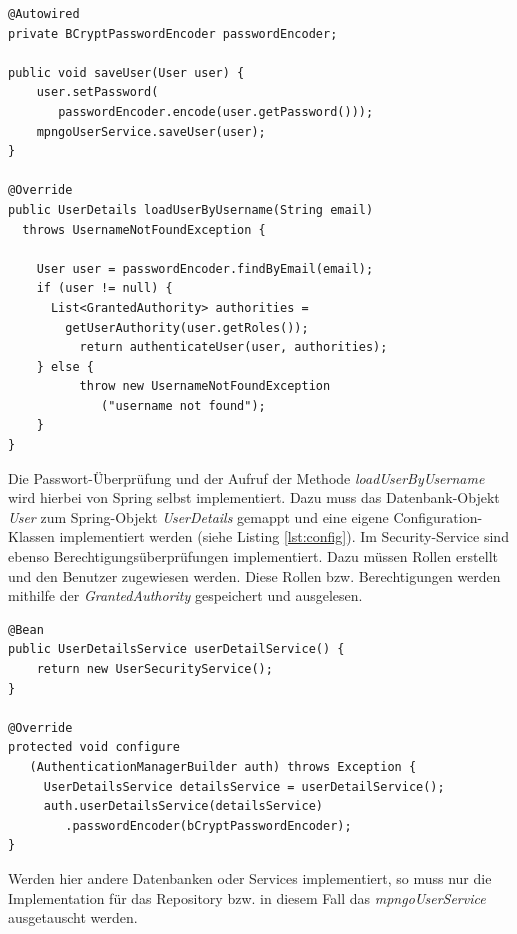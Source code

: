 \begin{samepage}%
	\begin{lstlisting}[float=tbhp]
@Autowired
private BCryptPasswordEncoder passwordEncoder;

public void saveUser(User user) {
    user.setPassword(
       passwordEncoder.encode(user.getPassword()));
    mpngoUserService.saveUser(user);
}

@Override
public UserDetails loadUserByUsername(String email) 
  throws UsernameNotFoundException {

    User user = passwordEncoder.findByEmail(email);
    if (user != null) {
      List<GrantedAuthority> authorities =     
        getUserAuthority(user.getRoles());
          return authenticateUser(user, authorities);
    } else {
          throw new UsernameNotFoundException
             ("username not found");
    }
}
	\end{lstlisting}
\end{samepage}
Die Passwort-Überprüfung und der Aufruf der Methode \textit{loadUserByUsername} wird hierbei von Spring selbst implementiert.  Dazu muss das Datenbank-Objekt \textit{User} zum Spring-Objekt \textit{UserDetails} gemappt und eine eigene Configuration-Klassen implementiert werden (siehe Listing \ref{lst:config}). Im Security-Service sind ebenso Berechtigungsüberprüfungen implementiert. Dazu müssen Rollen erstellt und den Benutzer zugewiesen werden. Diese Rollen bzw. Berechtigungen werden mithilfe der \textit{GrantedAuthority} gespeichert und ausgelesen.

\lstset{
  caption={Konfiguration für das Spring Security UserService. Das Service \textit{UserSecurityService} wird nun als das zentrale Service für die Useroperationen von Spring Security verwendet.}, 
  basicstyle=\small\ttfamily, 
  label=lst:config, 
  language=Java,
  frame=single,
  breaklines=true, %
  postbreak=\mbox{\textcolor{red}{$\hookrightarrow$}\space},
}

\begin{samepage}%
	\begin{lstlisting}[float=tbhp]
@Bean
public UserDetailsService userDetailService() {
    return new UserSecurityService();
}

@Override
protected void configure
   (AuthenticationManagerBuilder auth) throws Exception {
     UserDetailsService detailsService = userDetailService();
     auth.userDetailsService(detailsService)
        .passwordEncoder(bCryptPasswordEncoder);
}
	\end{lstlisting}
\end{samepage}
Werden hier andere Datenbanken oder Services implementiert, so muss nur die Implementation für das Repository bzw. in diesem Fall das \textit{mpngoUserService} ausgetauscht werden. 
